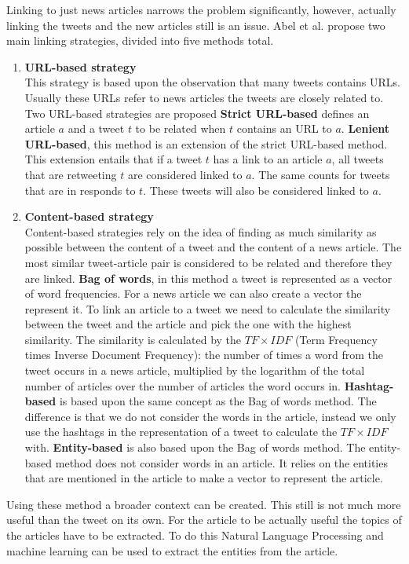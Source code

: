 \documentclass{article}
\begin{document}
Linking to just news articles narrows the problem significantly, however, actually linking the tweets and the new articles still is an issue. Abel et al. propose two main linking strategies, divided into five methods total.
\begin{enumerate}
\item \textbf{URL-based strategy}\\
This strategy is based upon the observation that many tweets contains URLs. Usually these URLs refer to news articles the tweets are closely related to. Two URL-based strategies are proposed
	\subitem \textbf{Strict URL-based} defines an article $a$ and a tweet $t$ to be related when $t$ contains an URL to $a$.
	\subitem \textbf{Lenient URL-based}, this method is an extension of the strict URL-based method. This extension entails that if a tweet $t$ has a link to an article $a$, all tweets that are retweeting $t$ are considered linked to $a$. The same counts for tweets that are in responds to $t$. These tweets will also be considered linked to $a$.
\item \textbf{Content-based strategy}\\
Content-based strategies rely on the idea of finding as much similarity as possible between the content of a tweet and the content of a news article. The most similar tweet-article pair is considered to be related and therefore they are linked.
	\subitem \textbf{Bag of words}, in this method a tweet is represented as a vector of word frequencies. For a news article we can also create a vector the represent it. To link an article to a tweet we need to calculate the similarity between the tweet and the article and pick the one with the highest similarity. The similarity is calculated by the $TF \times IDF$ (Term Frequency times Inverse Document Frequency): the number of times a word from the tweet occurs in a news article, multiplied by the logarithm of the total number of articles over the number of articles the word occurs in. \cite{tfidf}
	\subitem \textbf{Hashtag-based} is based upon the same concept as the Bag of words method. The difference is that we do not consider the words in the article, instead we only use the hashtags in the representation of a tweet to calculate the $TF \times IDF$ with.
	\subitem \textbf{Entity-based} is also based upon the Bag of words method. The entity-based method does not consider words in an article. It relies on the entities that are mentioned in the article to make a vector to represent the article. 
\end{enumerate}
Using these method a broader context can be created. This still is not much more useful than the tweet on its own. For the article to be actually useful the topics of the articles have to be extracted. To do this Natural Language Processing and machine learning can be used to extract the entities from the article.  
\end{document}
